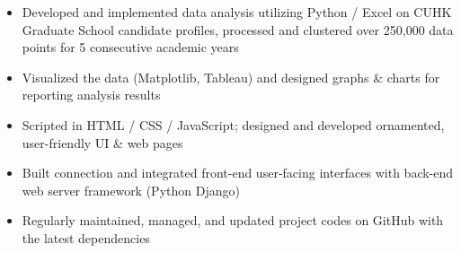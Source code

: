 \documentclass[classic]{resume}
\begin{document}
    \begin{itemize}
        \item Developed and implemented data analysis utilizing  Python / Excel on CUHK Graduate School candidate profiles, processed and clustered over 250,000 data points for 5 consecutive academic years
        \item Visualized the data (Matplotlib, Tableau) and designed graphs \& charts for reporting analysis results
    \end{itemize}

    \begin{itemize}
        \item Scripted in HTML / CSS / JavaScript; designed and developed ornamented, user-friendly UI \& web pages
        \item Built connection and integrated front-end user-facing interfaces with back-end web server framework (Python Django)
        \item Regularly maintained, managed, and updated project codes on GitHub with the latest dependencies
    \end{itemize}

\end{document}
